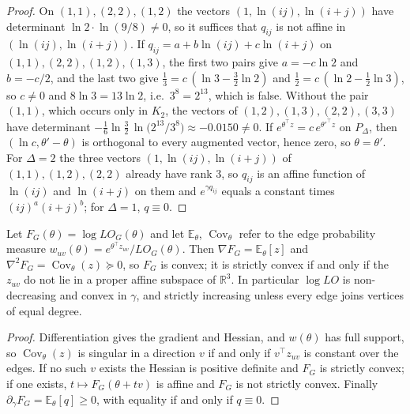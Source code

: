   \begin{proof}
  On $(1,1), (2,2), (1,2)$ the vectors $(1, \ln(ij), \ln(i+j))$ have
  determinant $\ln 2 \cdot \ln(9/8) \ne 0$, so it suffices that $q_{ij}$
  is not affine in $(\ln(ij), \ln(i+j))$. If
  $q_{ij} = a + b \ln(ij) + c \ln(i+j)$ on $(1,1), (2,2), (1,2), (1,3)$,
  the first two pairs give $a = -c \ln 2$ and $b = -c/2$, and the last two
  give $\tfrac13 = c\,(\ln 3 - \tfrac32 \ln 2)$ and
  $\tfrac12 = c\,(\ln 2 - \tfrac12 \ln 3)$, so $c \ne 0$ and
  $8 \ln 3 = 13 \ln 2$, i.e.\ $3^{8} = 2^{13}$, which is false. Without
  the pair $(1,1)$, which occurs only in $K_2$, the vectors of
  $(1,2), (1,3), (2,2), (3,3)$ have determinant
  $-\tfrac16 \ln\tfrac32 \,\ln\bigl(2^{13}/3^{8}\bigr) \approx -0.0150 \ne 0$.
  If $e^{\theta^{\top} z} = c\, e^{\theta'^{\top} z}$ on $P_{\Delta}$, then
  $(\ln c, \theta' - \theta)$ is orthogonal to every augmented vector,
  hence zero, so $\theta = \theta'$. For $\Delta = 2$ the three vectors
  $(1, \ln(ij), \ln(i+j))$ of $(1,1), (1,2), (2,2)$ already have rank $3$,
  so $q_{ij}$ is an affine function of $\ln(ij)$ and $\ln(i+j)$ on them and
  $e^{\gamma q_{ij}}$ equals a constant times $(ij)^{a}(i+j)^{b}$; for
  $\Delta = 1$, $q \equiv 0$.
  \end{proof}

  \begin{theorem}\label{thm:logconvex}
  Let $F_G(\theta) = \log LO_G(\theta)$ and let $\mathbb{E}_{\theta}$,
  $\operatorname{Cov}_{\theta}$ refer to the edge probability measure
  $w_{uv}(\theta) = e^{\theta^{\top} z_{uv}} / LO_G(\theta)$. Then
  $\nabla F_G = \mathbb{E}_{\theta}[z]$ and
  $\nabla^2 F_G = \operatorname{Cov}_{\theta}(z) \succeq 0$, so $F_G$ is
  convex; it is strictly convex if and only if the $z_{uv}$ do not lie in
  a proper affine subspace of $\mathbb{R}^3$. In particular
  $\log LO$ is non-decreasing and convex in $\gamma$, and strictly
  increasing unless every edge joins vertices of equal degree.
  \end{theorem}

  \begin{proof}
  Differentiation gives the gradient and Hessian, and $w(\theta)$ has full
  support, so $\operatorname{Cov}_{\theta}(z)$ is singular in a direction
  $v$ if and only if $v^{\top} z_{uv}$ is constant over the edges. If no
  such $v$ exists the Hessian is positive definite and $F_G$ is strictly
  convex; if one exists, $t \mapsto F_G(\theta + tv)$ is affine and $F_G$
  is not strictly convex. Finally
  $\partial_{\gamma} F_G = \mathbb{E}_{\theta}[q] \ge 0$, with equality
  if and only if $q \equiv 0$.
  \end{proof}

